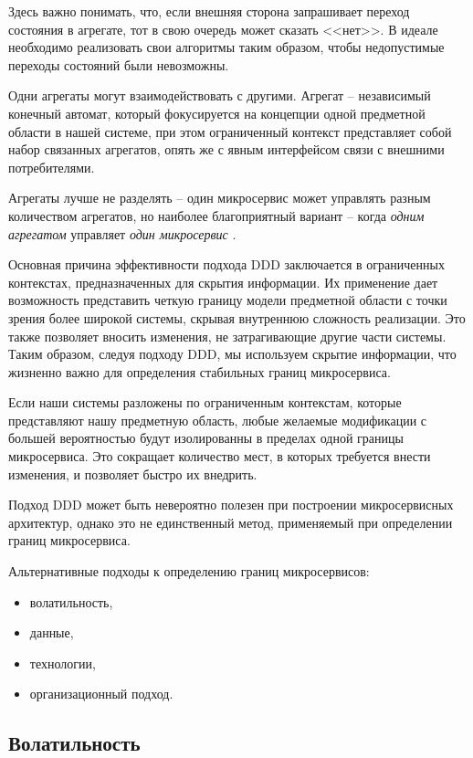 \documentclass[%
	11pt,
	a4paper,
	utf8,
		]{article}
\begin{document}
Здесь важно понимать, что, если внешняя сторона запрашивает переход состояния в агрегате, тот в свою очередь может сказать <<нет>>. В идеале необходимо реализовать свои алгоритмы таким образом, чтобы недопустимые переходы состояний были невозможны.

Одни агрегаты могут взаимодействовать с другими. Агрегат -- независимый конечный автомат, который фокусируется на концепции одной предметной области в нашей системе, при этом ограниченный контекст представляет собой набор связанных агрегатов, опять же с явным интерфейсом связи с внешними потребителями.

Агрегаты лучше не разделять -- один микросервис может управлять разным количеством агрегатов, но наиболее благоприятный вариант -- когда \emph{одним агрегатом} управляет \emph{один микросервис} \cite[]{microservices-2024}.

Основная причина эффективности подхода DDD заключается в ограниченных контекстах, предназначенных для скрытия информации. Их применение дает возможность представить четкую границу модели предметной области с точки зрения более широкой системы, скрывая внутреннюю сложность реализации. Это также позволяет вносить изменения, не затрагивающие другие части системы. Таким образом, следуя подходу DDD, мы используем скрытие информации, что жизненно важно для определения стабильных границ микросервиса.

Если наши системы разложены по ограниченным контекстам, которые представляют нашу предметную область, любые желаемые модификации с большей вероятностью будут изолированны в пределах одной границы микросервиса. Это сокращает количество мест, в которых требуется внести изменения, и позволяет быстро их внедрить.

Подход DDD может быть невероятно полезен при построении микросервисных архитектур, однако это не единственный метод, применяемый при определении границ микросервиса. 

Альтернативные подходы к определению границ микросервисов:
\begin{itemize}
	\item волатильность,
	
	\item данные,
	
	\item технологии,
	
	\item организационный подход.
\end{itemize}

\subsection{Волатильность}
\end{document}
